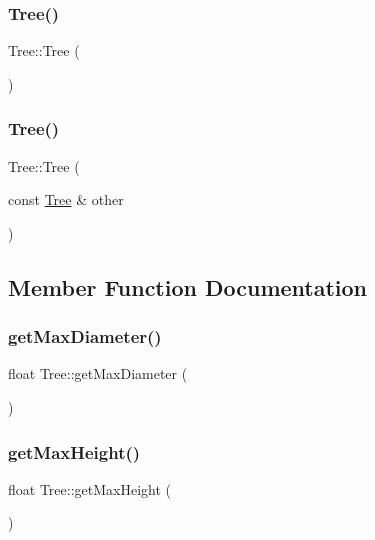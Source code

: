 \subsubsection{\texorpdfstring{Tree()}{Tree()}\hspace{0.1cm}{\footnotesize\ttfamily [1/2]}}
{\footnotesize\ttfamily Tree\+::\+Tree (\begin{DoxyParamCaption}{ }\end{DoxyParamCaption})}

\mbox{\label{class_tree_af785767b64df102fdfe700b745d8bb46}} 
\subsubsection{\texorpdfstring{Tree()}{Tree()}\hspace{0.1cm}{\footnotesize\ttfamily [2/2]}}
{\footnotesize\ttfamily Tree\+::\+Tree (\begin{DoxyParamCaption}\item[{const \mbox{\hyperlink{class_tree}{Tree}} \&}]{other }\end{DoxyParamCaption})}



\subsection{Member Function Documentation}
\mbox{\label{class_tree_aad7df58595f64d5c3f5b1e7ff5ae6cd9}} 
\subsubsection{\texorpdfstring{get\+Max\+Diameter()}{getMaxDiameter()}}
{\footnotesize\ttfamily float Tree\+::get\+Max\+Diameter (\begin{DoxyParamCaption}{ }\end{DoxyParamCaption})}

\mbox{\label{class_tree_a80804b08cd149e9f1a7a40c780ceaada}} 
\subsubsection{\texorpdfstring{get\+Max\+Height()}{getMaxHeight()}}
{\footnotesize\ttfamily float Tree\+::get\+Max\+Height (\begin{DoxyParamCaption}{ }\end{DoxyParamCaption})}

